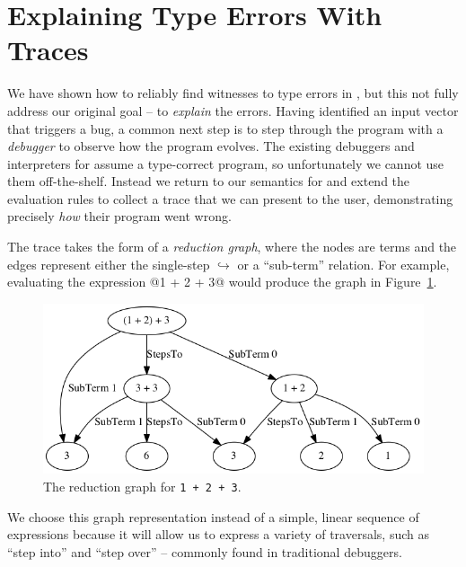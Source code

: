 \section{Explaining Type Errors With Traces}
\label{sec:explaining}
%
We have shown how to reliably find witnesses to type errors in \ocaml,
but this not fully address our original goal -- to \emph{explain} the
errors.
%
Having identified an input vector that triggers a bug, a common next
step is to step through the program with a \emph{debugger} to observe
how the program evolves.
%
The existing debuggers and interpreters for \ocaml assume a type-correct
program, so unfortunately we cannot use them off-the-shelf.
%
Instead we return to our semantics for \lang and extend the evaluation
rules to collect a trace that we can present to the user, demonstrating
precisely \emph{how} their program went wrong.

The trace takes the form of a \emph{reduction graph}, where the nodes
are terms and the edges represent either the single-step
$\hookrightarrow$ or a ``sub-term'' relation. For example, evaluating
the expression @1 + 2 + 3@ would produce the graph in
Figure~\ref{fig:simple-reduction}.
%
\begin{figure}[t]
  \centering
  \includegraphics[width=\linewidth]{simple.png}
\caption{The reduction graph for \texttt{1 + 2 + 3}.}
\label{fig:simple-reduction}
\end{figure}
%
We choose this graph representation instead of a simple, linear sequence
of expressions because it will allow us to express a variety of
traversals, such as ``step into'' and ``step over'' -- commonly found in
traditional debuggers.

